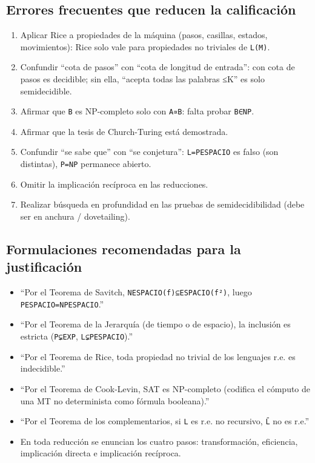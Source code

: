\documentclass[12pt]{book} %
\providecommand{\tightlist}{%
  \setlength{\itemsep}{0pt}\setlength{\parskip}{0pt}}
\begin{document}
\hypertarget{errores-frecuentes-que-reducen-la-calificaciuxf3n}{%
\subsection{Errores frecuentes que reducen la
calificación}\label{errores-frecuentes-que-reducen-la-calificaciuxf3n}}

\begin{enumerate}
\def\labelenumi{\arabic{enumi}.}
\tightlist
\item
  Aplicar Rice a propiedades de la máquina (pasos, casillas, estados,
  movimientos): Rice solo vale para propiedades no triviales de
  \texttt{L(M)}.
\item
  Confundir ``cota de pasos'' con ``cota de longitud de entrada'': con
  cota de pasos es decidible; sin ella, ``acepta todas las palabras ≤K''
  es solo semidecidible.
\item
  Afirmar que \texttt{B} es NP-completo solo con \texttt{A∝B}: falta
  probar \texttt{B∈NP}.
\item
  Afirmar que la tesis de Church-Turing está demostrada.
\item
  Confundir ``se sabe que'' con ``se conjetura'': \texttt{L=PESPACIO} es
  falso (son distintas), \texttt{P=NP} permanece abierto.
\item
  Omitir la implicación recíproca en las reducciones.
\item
  Realizar búsqueda en profundidad en las pruebas de semidecidibilidad
  (debe ser en anchura / dovetailing).
\end{enumerate}

\hypertarget{formulaciones-recomendadas-para-la-justificaciuxf3n}{%
\subsection{Formulaciones recomendadas para la
justificación}\label{formulaciones-recomendadas-para-la-justificaciuxf3n}}

\begin{itemize}
\tightlist
\item
  ``Por el Teorema de Savitch, \texttt{NESPACIO(f)⊆ESPACIO(f²)}, luego
  \texttt{PESPACIO=NPESPACIO}.''
\item
  ``Por el Teorema de la Jerarquía (de tiempo o de espacio), la
  inclusión es estricta (\texttt{P⊊EXP}, \texttt{L⊊PESPACIO}).''
\item
  ``Por el Teorema de Rice, toda propiedad no trivial de los lenguajes
  r.e. es indecidible.''
\item
  ``Por el Teorema de Cook-Levin, SAT es NP-completo (codifica el
  cómputo de una MT no determinista como fórmula booleana).''
\item
  ``Por el Teorema de los complementarios, si \texttt{L} es r.e. no
  recursivo, \texttt{L̄} no es r.e.''
\item
  En toda reducción se enuncian los cuatro pasos: transformación,
  eficiencia, implicación directa e implicación recíproca.
\end{itemize}
\end{document}
